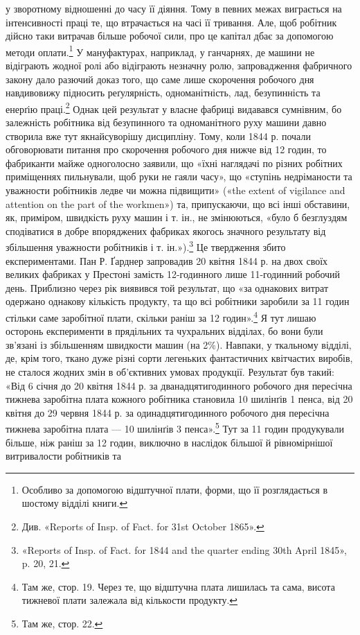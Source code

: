 у зворотному відношенні до часу її діяння. Тому в певних межах
виграється на інтенсивності праці те, що втрачається на часі її
тривання. Але, щоб робітник дійсно таки витрачав більше робочої
сили, про це капітал дбає за допомогою методи оплати.\footnote{
Особливо за допомогою відштучної плати, форми, що її розглядається
в шостому відділі книги.
} У мануфактурах,
наприклад, у ганчарнях, де машини не відіграють
жодної ролі або відіграють незначну ролю, запровадження фабричного
закону дало разючий доказ того, що саме лише скорочення
робочого дня навдивовижу підносить реґулярність, одноманітність,
лад, безупинність та енерґію праці.\footnote{
Див. «Reports of Insp. of Fact. for 31st October 1865».
} Однак цей результат
у власне фабриці видавався сумнівним, бо залежність робітника
від безупинного та одноманітного руху машини давно створила
вже тут якнайсуворішу дисципліну. Тому, коли 1844 р.
почали обговорювати питання про скорочення робочого дня
нижче від 12 годин, то фабриканти майже одноголосно заявили,
що «їхні наглядачі по різних робітних приміщеннях пильнували,
щоб руки не гаяли часу», що «ступінь недріманости та уважности
робітників ледве чи можна підвищити» («the extent of vigilance
and attention on the part of the workmen») та, припускаючи, що всі
інші обставини, як, приміром, швидкість руху машин і т. ін.,
не змінюються, «було б безглуздям сподіватися в добре впоряджених
фабриках якогось значного результату від збільшення
уважности робітників і т. ін.»).\footnote{
«Reports of Insp. of Fact. for 1844 and the quarter ending 30th
April 1845», p. 20, 21.
} Це твердження збито експериментами.
Пан Р. Ґарднер запровадив 20 квітня 1844 р. на двох
своїх великих фабриках у Престоні замість 12-годинного лише
11-годинний робочий день. Приблизно через рік виявився
той результат, що «за однакових витрат одержано однакову
кількість продукту, та що всі робітники заробили за 11 годин
стільки саме заробітної плати, скільки раніш за 12 годин».\footnote{
Там же, стор. 19. Через те, що відштучна плата лишилась та
сама, висота тижневої плати залежала від кількости продукту.
}
Я тут лишаю осторонь експерименти в прядільних та чухральних
відділах, бо вони були зв’язані із збільшенням швидкости машин
(на 2\%). Навпаки, у ткальному відділі, де, крім того, ткано
дуже різні сорти легеньких фантастичних квітчастих виробів,
не сталося жодних змін в об’єктивних умовах продукції. Результат
був такий: «Від 6 січня до 20 квітня 1844 р. за дванадцятигодинного
робочого дня пересічна тижнева заробітна плата кожного
робітника становила 10 шилінґів 1 пенса, від 20 квітня до
29 червня 1844 р. за одинадцятигодинного робочого дня пересічна
тижнева заробітна плата — 10 шилінґів 3 пенса».\footnote{
Там же, стор. 22.
} Тут за
11 годин продукували більше, ніж раніш за 12 годин, виключно
в наслідок більшої й рівномірнішої витривалости робітників та